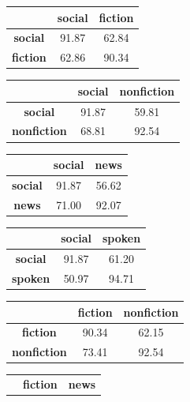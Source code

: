 \begin{table}[H]
\begin{tabular}{|c|c|c|}
    \hline
    \end{tabular}%
    \vspace{5mm}
    \begin{tabular}{|c|c|c|}
    \hline
         & \textbf{social} & \textbf{fiction} \\
    \hline
    \textbf{social} & 91.87 & 62.84 \\
    \textbf{fiction} & 62.86 & 90.34 \\
    \hline
    \end{tabular}%
    \vspace{5mm}
    \begin{tabular}{|c|c|c|}
    \hline
         & \textbf{social} & \textbf{nonfiction} \\
    \hline
    \textbf{social} & 91.87 & 59.81 \\
    \textbf{nonfiction} & 68.81 & 92.54 \\
    \hline
    \end{tabular}%
    \vspace{5mm}
    \begin{tabular}{|c|c|c|}
    \hline
         & \textbf{social} & \textbf{news} \\
    \hline
    \textbf{social} & 91.87 & 56.62 \\
    \textbf{news} & 71.00 & 92.07 \\
    \hline
    \end{tabular}%
    \vspace{5mm}
    \begin{tabular}{|c|c|c|}
    \hline
         & \textbf{social} & \textbf{spoken} \\
    \hline
    \textbf{social} & 91.87 & 61.20 \\
    \textbf{spoken} & 50.97 & 94.71 \\
    \hline
    \end{tabular}%
    \vspace{5mm}
    \begin{tabular}{|c|c|c|}
    \hline
         & \textbf{fiction} & \textbf{nonfiction} \\
    \hline
    \textbf{fiction} & 90.34 & 62.15 \\
    \textbf{nonfiction} & 73.41 & 92.54 \\
    \hline
    \end{tabular}%
    \vspace{5mm}
    \begin{tabular}{|c|c|c|}
    \hline
         & \textbf{fiction} & \textbf{news} \\

\end{tabular}
\end{table}
